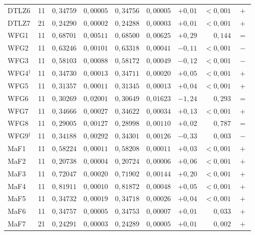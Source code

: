 \begin{table}[!htb]
\begin{tabular*}{\textwidth}{@{\extracolsep{\fill}}lrrrrrrrc@{}}
        DTLZ6 & 11 & $0{,}34759$ & $0{,}00005$ & $0{,}34756$ & $0{,}00005$ & $+0{,}01$ & $<0{,}001$ & $+$ \\
        DTLZ7 & 21 & $0{,}24290$ & $0{,}00002$ & $0{,}24288$ & $0{,}00003$ & $+0{,}01$ & $<0{,}001$ & $+$ \\
        \addlinespace
        WFG1 & 11 & $0{,}68701$ & $0{,}00511$ & $0{,}68500$ & $0{,}00625$ & $+0{,}29$ & $0{,}144$ & $=$ \\
        WFG2 & 11 & $0{,}63246$ & $0{,}00101$ & $0{,}63318$ & $0{,}00041$ & $-0{,}11$ & $<0{,}001$ & $-$ \\
        WFG3 & 11 & $0{,}58103$ & $0{,}00088$ & $0{,}58172$ & $0{,}00049$ & $-0{,}12$ & $<0{,}001$ & $-$ \\
        WFG4$^{\dagger}$ & 11 & $0{,}34730$ & $0{,}00013$ & $0{,}34711$ & $0{,}00020$ & $+0{,}05$ & $<0{,}001$ & $+$ \\
        WFG5 & 11 & $0{,}31357$ & $0{,}00011$ & $0{,}31345$ & $0{,}00013$ & $+0{,}04$ & $<0{,}001$ & $+$ \\
        WFG6 & 11 & $0{,}30269$ & $0{,}02001$ & $0{,}30649$ & $0{,}01623$ & $-1{,}24$ & $0{,}293$ & $=$ \\
        WFG7 & 11 & $0{,}34666$ & $0{,}00027$ & $0{,}34622$ & $0{,}00034$ & $+0{,}13$ & $<0{,}001$ & $+$ \\
        WFG8 & 11 & $0{,}29005$ & $0{,}00127$ & $0{,}28998$ & $0{,}00110$ & $+0{,}02$ & $0{,}787$ & $=$ \\
        WFG9$^{\dagger}$ & 11 & $0{,}34188$ & $0{,}00292$ & $0{,}34301$ & $0{,}00126$ & $-0{,}33$ & $0{,}003$ & $-$ \\
        \addlinespace
        MaF1 & 11 & $0{,}58224$ & $0{,}00011$ & $0{,}58208$ & $0{,}00011$ & $+0{,}03$ & $<0{,}001$ & $+$ \\
        MaF2 & 11 & $0{,}20738$ & $0{,}00004$ & $0{,}20724$ & $0{,}00006$ & $+0{,}06$ & $<0{,}001$ & $+$ \\
        MaF3 & 11 & $0{,}72047$ & $0{,}00020$ & $0{,}71902$ & $0{,}00144$ & $+0{,}20$ & $<0{,}001$ & $+$ \\
        MaF4 & 11 & $0{,}81911$ & $0{,}00010$ & $0{,}81872$ & $0{,}00048$ & $+0{,}05$ & $<0{,}001$ & $+$ \\
        MaF5 & 11 & $0{,}34732$ & $0{,}00019$ & $0{,}34718$ & $0{,}00026$ & $+0{,}04$ & $<0{,}001$ & $+$ \\
        MaF6 & 11 & $0{,}34757$ & $0{,}00005$ & $0{,}34753$ & $0{,}00007$ & $+0{,}01$ & $0{,}033$ & $+$ \\
        MaF7 & 21 & $0{,}24291$ & $0{,}00003$ & $0{,}24289$ & $0{,}00005$ & $+0{,}01$ & $0{,}002$ & $+$ \\

\end{tabular*}
\end{table}
